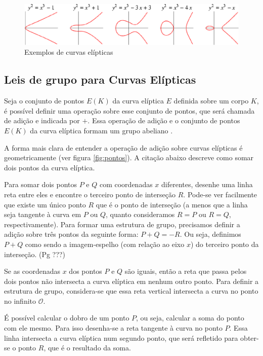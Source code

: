 \begin{figure}[h]
\centering
\includegraphics[scale=0.5, bb=0 0 529 101]{figuras/curvas.eps}
\caption{Exemplos de curvas elípticas}
\label{fig:curvas}
\end{figure}

\subsection{Leis de grupo para Curvas Elípticas}

Seja o conjunto de pontos $E(K)$ da curva elíptica $E$ definida sobre um corpo $K$, é possível definir uma operação sobre esse conjunto de pontos, que será chamada de adição e indicada por $+$. Essa operação de adição e o conjunto de pontos $E(K)$ da curva elíptica formam um grupo abeliano \cite{Stallings:2011}.

A forma mais clara de entender a operação de adição sobre curvas elípticas é geometricamente (ver figura \ref{fig:pontos}). A citação abaixo descreve como somar dois pontos da curva elíptica.
\begin{citacao}
Para somar dois pontos \(P\) e \(Q\) com coordenadas \(x\) diferentes, desenhe uma linha reta entre eles e encontre o terceiro ponto de interseção \(R\). Pode-se ver facilmente que existe um único ponto \(R\) que é o ponto de interseção (a menos que a linha seja tangente à curva em \(P\) ou \(Q\), quanto consideramos $R=P$ ou $R=Q$, respectivamente). Para formar uma estrutura de grupo, precisamos definir a adição sobre três pontos da seguinte forma: $P+Q=-R$. Ou seja, definimos $P+Q$ como sendo a imagem-espelho (com relação ao eixo \(x\)) do terceiro ponto da interseção. \cite{Stallings:2011} (Pg ???)
\end{citacao}

Se as coordenadas $x$ dos pontos $P$ e $Q$ são iguais, então a reta que passa pelos dois pontos não intersecta a curva elíptica em nenhum outro ponto. Para definir a estrutura de grupo, considera-se que essa reta vertical intersecta a curva no ponto no infinito $\mathcal{O}$. \cite{Stallings:2011}

É possível calcular o dobro de um ponto $P$, ou seja, calcular a soma do ponto com ele mesmo. Para isso desenha-se a reta tangente à curva no ponto $P$. Essa linha intersecta a curva elíptica num segundo ponto, que será refletido para obter-se o ponto $R$, que é o resultado da soma. \cite{Guide}

